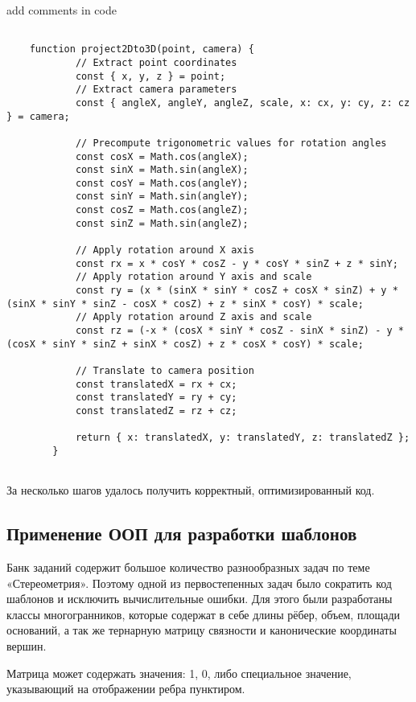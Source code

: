 \begin{leftBox}
	add comments in code
\end{leftBox}

\begin{lstlisting}[numbers=none]
	
	function project2Dto3D(point, camera) {
			// Extract point coordinates
			const { x, y, z } = point;
			// Extract camera parameters
			const { angleX, angleY, angleZ, scale, x: cx, y: cy, z: cz } = camera;

			// Precompute trigonometric values for rotation angles
			const cosX = Math.cos(angleX);
			const sinX = Math.sin(angleX);
			const cosY = Math.cos(angleY);
			const sinY = Math.sin(angleY);
			const cosZ = Math.cos(angleZ);
			const sinZ = Math.sin(angleZ);

			// Apply rotation around X axis
			const rx = x * cosY * cosZ - y * cosY * sinZ + z * sinY;
			// Apply rotation around Y axis and scale
			const ry = (x * (sinX * sinY * cosZ + cosX * sinZ) + y * (sinX * sinY * sinZ - cosX * cosZ) + z * sinX * cosY) * scale;
			// Apply rotation around Z axis and scale
			const rz = (-x * (cosX * sinY * cosZ - sinX * sinZ) - y * (cosX * sinY * sinZ + sinX * cosZ) + z * cosX * cosY) * scale;

			// Translate to camera position
			const translatedX = rx + cx;
			const translatedY = ry + cy;
			const translatedZ = rz + cz;

			return { x: translatedX, y: translatedY, z: translatedZ };
		}
	
\end{lstlisting}

За несколько шагов удалось получить корректный, оптимизированный код.

\subsection{Применение ООП для разработки шаблонов}


Банк заданий содержит большое количество разнообразных задач по теме «Стереометрия». Поэтому одной из первостепенных задач было сократить код шаблонов и исключить вычислительные ошибки. Для этого были разработаны классы многогранников, которые содержат в себе длины рёбер, объем, площади оснований, а так же тернарную матрицу связности и канонические координаты вершин.

Матрица может содержать значения: 1, 0, либо специальное значение, указывающий на отображении ребра пунктиром.

